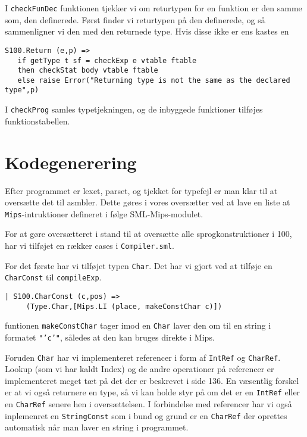 \documentclass[12pt]{article}
\begin{document}
I \texttt{checkFunDec} funktionen tjekker vi om returtypen for en funktion er
den samme som, den definerede. Først finder vi returtypen på den definerede, og
så sammenligner vi den med den returnede type. Hvis disse ikke er ens kastes en

\begin{verbatim}
S100.Return (e,p) => 
   if getType t sf = checkExp e vtable ftable
   then checkStat body vtable ftable
   else raise Error("Returning type is not the same as the declared type",p)
\end{verbatim}

I \texttt{checkProg} samles typetjekningen, og de inbyggede funktioner tilføjes
funktionstabellen.

\section{Kodegenerering}
Efter programmet er lexet, parset, og tjekket for typefejl er man klar til at
oversætte det til asmbler. Dette gøres i vores oversætter ved at lave en liste
at \texttt{Mips}-intruktioner defineret i følge SML-Mips-modulet.

For at gøre oversætteret i stand til at oversætte alle sprogkonstruktioner i
100, har vi tilføjet en rækker cases i \texttt{Compiler.sml}.

For det første har vi tilføjet typen \texttt{Char}. Det har vi gjort ved at
tilføje en \texttt{CharConst} til \texttt{compileExp}.

\begin{verbatim}
| S100.CharConst (c,pos) =>
     (Type.Char,[Mips.LI (place, makeConstChar c)])
\end{verbatim}

funtionen \texttt{makeConstChar} tager imod en \texttt{Char} laver den om til en
string i formatet \texttt{"'c'"}, således at den kan bruges direkte i Mips.

Foruden \texttt{Char} har vi implementeret referencer i form af \texttt{IntRef}
og \texttt{CharRef}. Lookup (som vi har kaldt Index) og de andre operationer på
referencer er implementeret meget tæt på det der er beskrevet i
\cite{Mogensen11} side 136. En væsentlig forskel er at vi også returnere en
type, så vi kan holde styr på om det er en \texttt{IntRef} eller en
\texttt{CharRef} senere hen i oversættelsen. I forbindelse med referencer har vi
også inplemenret en \texttt{StringConst} som i bund og grund er en
\texttt{CharRef} der oprettes automatisk når man laver en string i programmet.
\end{document}
